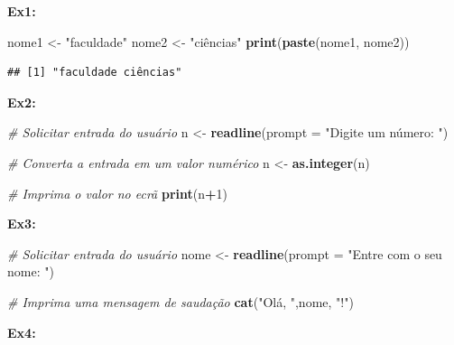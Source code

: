 \documentclass[
]{book}
\newenvironment{Shaded}{\begin{snugshade}}{\end{snugshade}}
\newcommand{\AttributeTok}[1]{\textcolor[rgb]{0.13,0.29,0.53}{#1}}
\newcommand{\CommentTok}[1]{\textcolor[rgb]{0.56,0.35,0.01}{\textit{#1}}}
\newcommand{\DecValTok}[1]{\textcolor[rgb]{0.00,0.00,0.81}{#1}}
\newcommand{\FunctionTok}[1]{\textcolor[rgb]{0.13,0.29,0.53}{\textbf{#1}}}
\newcommand{\NormalTok}[1]{#1}
\newcommand{\OtherTok}[1]{\textcolor[rgb]{0.56,0.35,0.01}{#1}}
\newcommand{\SpecialCharTok}[1]{\textcolor[rgb]{0.81,0.36,0.00}{\textbf{#1}}}
\newcommand{\StringTok}[1]{\textcolor[rgb]{0.31,0.60,0.02}{#1}}
\begin{document}
\textbf{Ex1:}

\begin{Shaded}
\begin{Highlighting}[]
\NormalTok{nome1 }\OtherTok{\textless{}{-}} \StringTok{"faculdade"}
\NormalTok{nome2 }\OtherTok{\textless{}{-}} \StringTok{"ciências"}
\FunctionTok{print}\NormalTok{(}\FunctionTok{paste}\NormalTok{(nome1, nome2))}
\end{Highlighting}
\end{Shaded}

\begin{verbatim}
## [1] "faculdade ciências"
\end{verbatim}

\textbf{Ex2:}

\begin{Shaded}
\begin{Highlighting}[]
\CommentTok{\# Solicitar entrada do usuário}
\NormalTok{n }\OtherTok{\textless{}{-}} \FunctionTok{readline}\NormalTok{(}\AttributeTok{prompt =} \StringTok{"Digite um número: "}\NormalTok{)}

\CommentTok{\# Converta a entrada em um valor numérico}
\NormalTok{n }\OtherTok{\textless{}{-}} \FunctionTok{as.integer}\NormalTok{(n)}

\CommentTok{\# Imprima o valor no ecrã}
\FunctionTok{print}\NormalTok{(n}\SpecialCharTok{+}\DecValTok{1}\NormalTok{)}
\end{Highlighting}
\end{Shaded}

\textbf{Ex3:}

\begin{Shaded}
\begin{Highlighting}[]
\CommentTok{\# Solicitar entrada do usuário}
\NormalTok{nome }\OtherTok{\textless{}{-}} \FunctionTok{readline}\NormalTok{(}\AttributeTok{prompt =} \StringTok{"Entre com o seu nome: "}\NormalTok{)}
    
\CommentTok{\# Imprima uma mensagem de saudação}
\FunctionTok{cat}\NormalTok{(}\StringTok{"Olá, "}\NormalTok{,nome, }\StringTok{"!"}\NormalTok{)}
\end{Highlighting}
\end{Shaded}

\textbf{Ex4:}
\end{document}
